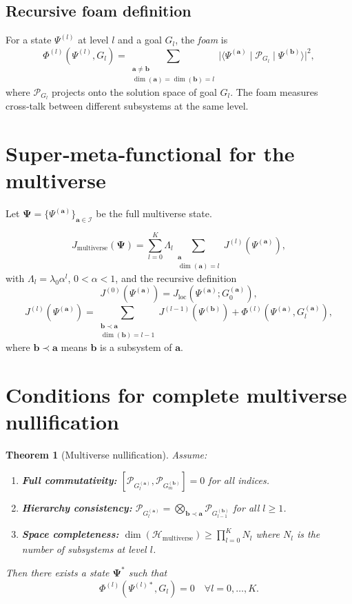 \documentclass[12pt]{article}
\newtheorem{theorem}{Theorem}
\theoremstyle{definition}
\begin{document}
\subsection{Recursive foam definition}
For a state \(\Psi^{(l)}\) at level \(l\) and a goal \(G_l\), the \emph{foam} is
\[
\Phi^{(l)}(\Psi^{(l)}, G_l) = \sum_{\substack{\mathbf{a}\neq\mathbf{b} \\ \dim(\mathbf{a})=\dim(\mathbf{b})=l}} \big| \langle \Psi^{(\mathbf{a})} \mid \mathcal{P}_{G_l} \mid \Psi^{(\mathbf{b})} \rangle \big|^2,
\]
where \(\mathcal{P}_{G_l}\) projects onto the solution space of goal \(G_l\). The foam measures cross‑talk between different subsystems at the same level.

\section{Super‑meta‑functional for the multiverse}
\label{sec:func}

Let \(\mathbf{\Psi} = \{\Psi^{(\mathbf{a})}\}_{\mathbf{a}\in\mathcal{I}}\) be the full multiverse state.

\[
J_{\text{multiverse}}(\mathbf{\Psi}) = \sum_{l=0}^K \Lambda_l \sum_{\substack{\mathbf{a} \\ \dim(\mathbf{a})=l}} J^{(l)}(\Psi^{(\mathbf{a})}),
\]
with \(\Lambda_l = \lambda_0 \alpha^l\), \(0<\alpha<1\), and the recursive definition
\[
J^{(0)}(\Psi^{(\mathbf{a})}) = J_{\text{loc}}(\Psi^{(\mathbf{a})}; G_0^{(\mathbf{a})}),
\]
\[
J^{(l)}(\Psi^{(\mathbf{a})}) = \sum_{\substack{\mathbf{b}\prec\mathbf{a} \\ \dim(\mathbf{b})=l-1}} J^{(l-1)}(\Psi^{(\mathbf{b})}) + \Phi^{(l)}(\Psi^{(\mathbf{a})}, G_l^{(\mathbf{a})}),
\]
where \(\mathbf{b}\prec\mathbf{a}\) means \(\mathbf{b}\) is a subsystem of \(\mathbf{a}\).

\section{Conditions for complete multiverse nullification}
\label{sec:null}

\begin{theorem}[Multiverse nullification]
Assume:
\begin{enumerate}
    \item \textbf{Full commutativity:} \([\mathcal{P}_{G_l^{(\mathbf{a})}}, \mathcal{P}_{G_m^{(\mathbf{b})}}] = 0\) for all indices.
    \item \textbf{Hierarchy consistency:} \(\mathcal{P}_{G_l^{(\mathbf{a})}} = \bigotimes_{\mathbf{b}\prec\mathbf{a}} \mathcal{P}_{G_{l-1}^{(\mathbf{b})}}\) for all \(l\ge1\).
    \item \textbf{Space completeness:} \(\dim(\mathcal{H}_{\text{multiverse}}) \ge \prod_{l=0}^K N_l\) where \(N_l\) is the number of subsystems at level \(l\).
\end{enumerate}
Then there exists a state \(\mathbf{\Psi}^*\) such that
\[
\Phi^{(l)}(\Psi^{(l)*}, G_l) = 0 \quad \forall l=0,\dots,K.
\]
\end{theorem}
\end{document}

